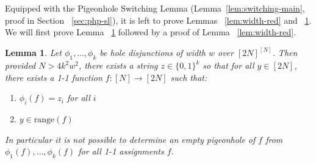 \documentclass[11pt]{article}
\newtheorem{lemma}{Lemma}
\newtheorem{definition}{Definition}
\newcommand{\todo}[1]{\textcolor{red}{TODO: #1}}
\newcommand{\B}{\{0,1\}}
\begin{document}
Equipped with the Pigeonhole Switching Lemma (Lemma~\ref{lem:switching-main}, proof in Section ~\ref{sec:php-sl}), it is left to prove Lemmas ~\ref{lem:width-red} and ~\ref{thm:1.5-lb}.   We will first prove Lemma 
~\ref{thm:1.5-lb} followed by a proof of Lemma ~\ref{lem:width-red}. 


\begin{lemma}\label{thm:1.5-lb}
Let $\phi_1,\ldots,\phi_k$ be hole disjunctions of width $w$ over $[2N]^{[N]}$. Then provided $N > 4k^2w^2$, there exists a string $z \in \B^k$ so that for all $y \in [2N]$, there exists a 1-1 function $f: [N] \rightarrow [2N]$ such that:
\begin{enumerate}
    \item $\phi_i(f) = z_i$ for all $i$
    \item $y \in \mathrm{range}(f)$
\end{enumerate}
In particular it is not possible to determine an empty pigeonhole of $f$ from $\phi_1(f),\ldots,\phi_k(f)$ for all 1-1 assignments $f$.
\end{lemma}
\end{document}
